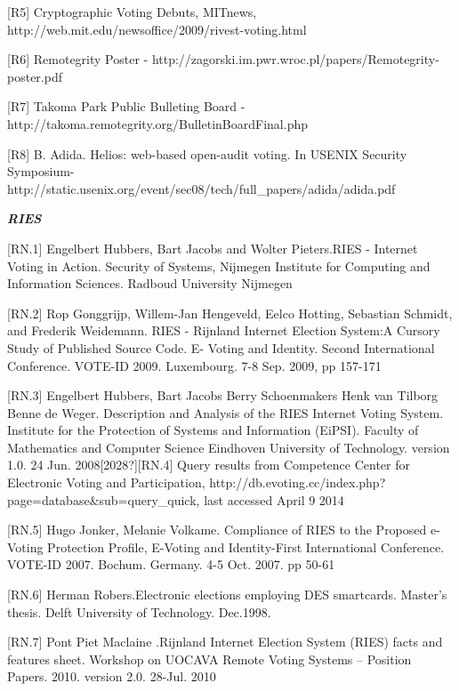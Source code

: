 [R5] Cryptographic Voting Debuts, MITnews, \textcolor[rgb]{0.078431375,0.3254902,0.6901961}{http://web.mit.edu/newsoffice/2009/rivest-voting.html}

[R6] Remotegrity Poster - \textcolor[rgb]{0.078431375,0.3254902,0.6901961}{http://zagorski.im.pwr.wroc.pl/papers/Remotegrity-poster.pdf}

[R7] Takoma Park Public Bulleting Board - \textcolor[rgb]{0.078431375,0.3254902,0.6901961}{http://takoma.remotegrity.org/BulletinBoardFinal.php}

[R8] B. Adida. Helios: web-based open-audit voting. In USENIX Security Symposium-\textcolor[rgb]{0.078431375,0.3254902,0.6901961}{http://static.usenix.org/event/sec08/tech/full\_papers/adida/adida.pdf}


\bigskip

\textbf{\textit{RIES}}

[RN.1] Engelbert Hubbers, Bart Jacobs and Wolter Pieters.RIES - Internet Voting in Action. Security of Systems, Nijmegen Institute for Computing and Information Sciences. Radboud University Nijmegen

[RN.2] Rop Gonggrijp, Willem-Jan Hengeveld, Eelco Hotting, Sebastian Schmidt, and Frederik Weidemann. RIES - Rijnland Internet Election System:A Cursory Study of Published Source Code. E- Voting and Identity. Second International Conference. VOTE-ID 2009. Luxembourg. 7-8 Sep. 2009, pp 157-171

[RN.3] Engelbert Hubbers, Bart Jacobs Berry Schoenmakers Henk van Tilborg Benne de Weger. Description and Analysis of the RIES Internet Voting System. Institute for the Protection of Systems and Information (EiPSI). Faculty of Mathematics and Computer Science Eindhoven University of Technology. version 1.0. 24 Jun. 2008[2028?][RN.4] Query results from Competence Center for Electronic Voting and Participation, \textcolor[rgb]{0.078431375,0.3254902,0.6901961}{http://db.evoting.cc/index.php?page=database\&sub=query\_quick, }last accessed April 9 2014

[RN.5] Hugo Jonker, Melanie Volkame. Compliance of RIES to the Proposed e-Voting Protection Profile, E-Voting and Identity-First International Conference. VOTE-ID 2007. Bochum. Germany. 4-5 Oct. 2007. pp 50-61

[RN.6] Herman Robers.Electronic elections employing DES smartcards. Master's thesis. Delft University of Technology. Dec.1998.

[RN.7] Pont Piet Maclaine .Rijnland Internet Election System (RIES) facts and features sheet. Workshop on UOCAVA Remote Voting Systems -- Position Papers. 2010. version 2.0. 28-Jul. 2010


